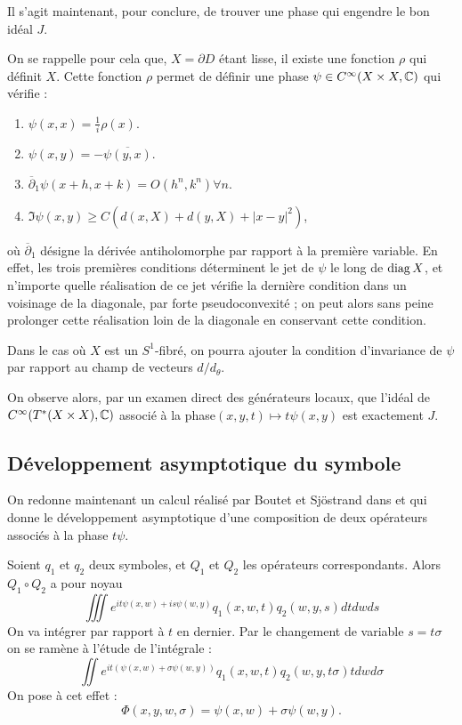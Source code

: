 Il s'agit maintenant, pour conclure, de trouver une phase qui engendre le bon idéal $J$.

On se rappelle pour cela que, $X=\partial D$ étant lisse, il existe une fonction $\rho$ qui définit $X$. Cette fonction $\rho$ permet de définir une phase $\psi \in C^{\infty}(X \times X,\mathbb{C})$ qui vérifie :

\begin{enumerate}
	\item $\psi(x,x) = \frac1i \rho(x)$.
	\item $\psi(x,y)=-\overline{\psi(y,x)}$.
	\item $\overline{\partial}_1 \psi(x+h,x+k)=O(h^n,k^n) \forall n$.
	\item $\Im \psi(x,y) \geq C(d(x,X)+d(y,X) + |x-y|^2)$,
\end{enumerate}
où $\overline{\partial}_1$ désigne la dérivée antiholomorphe par rapport à la première variable. En effet, les trois premières conditions déterminent le jet de $\psi$ le long de $\operatorname{diag} X$, et n'importe quelle réalisation de ce jet vérifie la dernière condition dans un voisinage de la diagonale, par forte pseudoconvexité ; on peut alors sans peine prolonger cette réalisation loin de la diagonale en conservant cette condition.

Dans le cas où $X$ est un $S^1$-fibré, on pourra ajouter la condition d'invariance de $\psi$ par rapport au champ de vecteurs $d/d_{\theta}$.

On observe alors, par un examen direct des générateurs locaux, que l'idéal de $C^{\infty}(T^*(X\times X), \mathbb{C})$ associé à la phase$(x,y,t)\mapsto t\psi(x,y)$ est exactement $J$.

\subsection{Développement asymptotique du symbole}

On redonne maintenant un calcul réalisé par Boutet et Sjöstrand dans \cite{BoutetdeMonvel1975} et qui donne le développement asymptotique d'une composition de deux opérateurs associés à la phase $t\psi$.

Soient $q_1$ et $q_2$ deux symboles, et $Q_1$ et $Q_2$ les opérateurs correspondants. Alors $Q_1\circ Q_2$ a pour noyau
\begin{equation*}
  \iiint e^{it\psi(x,w)+is\psi(w,y)}q_1(x,w,t)q_2(w,y,s)dtdwds
\end{equation*}
On va intégrer par rapport à $t$ en dernier. Par le changement de variable $s=t\sigma$ on se ramène à l'étude de l'intégrale :
\begin{equation*}
  \iint e^{it(\psi(x,w)+\sigma \psi(w,y))}q_1(x,w,t)q_2(w,y,t\sigma)tdwd\sigma
\end{equation*}
On pose à cet effet :
\begin{equation*}
  \Phi(x,y,w,\sigma)=\psi(x,w)+\sigma \psi(w,y).
\end{equation*}

